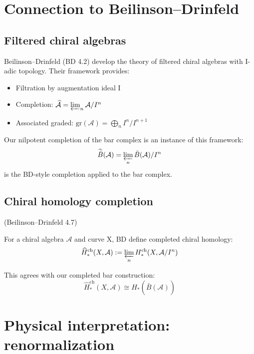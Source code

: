 \section{Connection to Beilinson--Drinfeld}

\subsection{Filtered chiral algebras}

\begin{remark}[BD framework]\label{rem:BD-filtered}
Beilinson--Drinfeld (BD 4.2) develop the theory of filtered chiral algebras with I-adic topology. Their framework provides:

\begin{itemize}
\item Filtration by augmentation ideal I
\item Completion: $\widehat{\mathcal{A}} = \varprojlim_n \mathcal{A}/I^n$
\item Associated graded: $\text{gr}(\mathcal{A}) = \bigoplus_n I^n/I^{n+1}$
\end{itemize}

Our nilpotent completion of the bar complex is an instance of this framework:
\[\widehat{\bar{B}}(\mathcal{A}) = \varprojlim_n \bar{B}(\mathcal{A})/I^n\]
is the BD-style completion applied to the bar complex.
\end{remark}

\subsection{Chiral homology completion}

\begin{theorem}\label{thm:BD-chiral-homology}
\textup{(Beilinson--Drinfeld 4.7)}

For a chiral algebra $\mathcal{A}$ and curve X, BD define completed chiral homology:
\[\widehat{H}_*^{\text{ch}}(X, \mathcal{A}) := \varprojlim_n H_*^{\text{ch}}(X, \mathcal{A}/I^n)\]

This agrees with our completed bar construction:
\[\widehat{H}_*^{\text{ch}}(X, \mathcal{A}) \cong H_*(\widehat{\bar{B}}(\mathcal{A}))\]
\end{theorem}

\section{Physical interpretation: renormalization}

